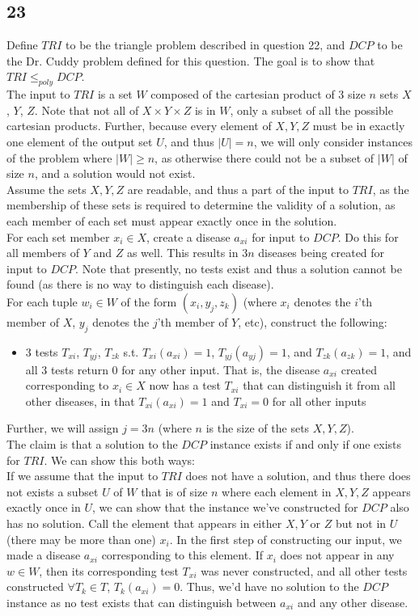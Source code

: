 \documentclass[letterpaper,notitlepage,twoside]{article}
\begin{document}
\subsection*{23}
Define $TRI$ to be the triangle problem described in question 22, and $DCP$ to be the Dr. Cuddy problem defined for this question. The goal is to show that $TRI \leq _{poly} DCP$. \\
The input to $TRI$ is a set $W$ composed of the cartesian product of 3 size $n$ sets $X$, $Y$, $Z$. Note that not all of $X \times Y \times Z$ is in $W$, only a subset of all the possible cartesian products. Further, because every element of $X, Y, Z$ must be in exactly one element of the output set $U$, and thus $|U| = n$, we will only consider instances of the problem where $|W| \geq n$, as otherwise there could not be a subset of $|W|$ of size $n$, and a solution would not exist. \\
Assume the sets $X, Y, Z$ are readable, and thus a part of the input to $TRI$, as the membership of these sets is required to determine the validity of a solution, as each member of each set must appear exactly once in the solution. \\
For each set member $x_i\in X$,  create a disease $a_{xi}$ for input to $DCP$. Do this for all members of $Y$ and $Z$ as well. This results in $3n$ diseases being created for input to $DCP$. Note that presently, no tests exist and thus a solution cannot be found (as there is no way to distinguish each disease). \\
For each tuple $w_i \in W$ of the form $(x_i, y_j, z_k)$ (where $x_i$ denotes the $i$'th member of $X$, $y_j$ denotes the $j$'th member of $Y$, etc), construct the following:
\begin{itemize}
\item 3 tests $T_{xi}$, $T_{yj}$, $T_{zk}$ s.t. $T_{xi}(a_{xi}) = 1$,  $T_{yj}(a_{yj}) = 1$, and  $T_{zk}(a_{zk}) = 1$, and all 3 tests return 0 for any other input. That is, the disease $a_{xi}$ created corresponding to $x_i \in X$ now has a test $T_{xi}$ that can distinguish it from all other diseases, in that  $T_{xi}(a_{xi}) = 1$ and $T_{xi} = 0$ for all other inputs
\end{itemize}
Further, we will assign $j=3n$ (where $n$ is the size of the sets $X, Y, Z$). \\
The claim is that a solution to the $DCP$ instance exists if and only if one exists for $TRI$. We can show this both ways: \\
If we assume that the input to $TRI$ does not have a solution, and thus there does not exists a subset $U$ of $W$ that is of size $n$ where each element in $X, Y, Z$ appears exactly once in $U$, we can show that the instance we've constructed for $DCP$ also has no solution. Call the element that appears in either $X, Y$ or $Z$ but not in $U$ (there may be more than one) $x_i$. In the first step of constructing our input, we made a disease $a_{xi}$ corresponding to this element. If $x_i$ does not appear in any $w \in W$, then its corresponding test $T_{xi}$ was never constructed, and all other tests constructed $\forall T_k \in T$, $T_k(a_{xi}) = 0$. Thus, we'd have no solution to the $DCP$ instance as no test exists that can distinguish between $a_{xi}$ and any other disease. \\
\end{document}
